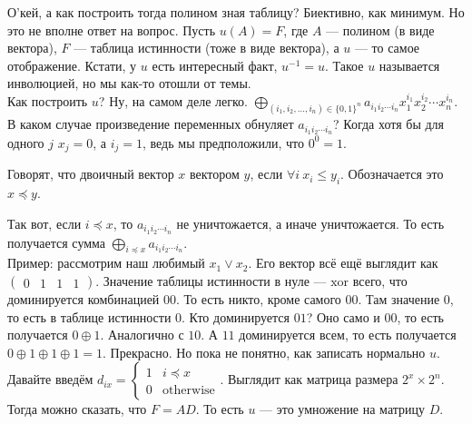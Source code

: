 \documentclass{article}
\begin{document}
\begin{itemize}
\begin{Comment}
            О'кей, а как построить тогда полином зная таблицу? Биективно, как минимум. Но это не вполне ответ на вопрос. Пусть $u(A)=F$, где $A$ --- полином (в виде вектора), $F$ --- таблица истинности (тоже в виде вектора), а $u$ --- то самое отображение. Кстати, у $u$ есть интересный факт, $u^{-1}=u$. Такое $u$ называется инволюцией, но мы как-то отошли от темы.\\
            Как построить $u$? Ну, на самом деле легко. $\bigoplus\limits_{(i_1,i_2,\ldots,i_n)\in\{0,1\}^n}a_{i_1i_2\cdots i_n}x_1^{i_1}x_2^{i_2}\cdots x_n^{i_n}$. В каком случае произведение переменных обнуляет $a_{i_1i_2\cdots i_n}$? Когда хотя бы для одного $j$ $x_j=0$, а $i_j=1$, ведь мы предположили, что $0^0=1$.
        \end{Comment}
        \dfn Говорят, что двоичный вектор $x$  вектором $y$, если $\forall i~x_i\leqslant y_i$. Обозначается это $x\preccurlyeq y$.
        \begin{Comment}
            Так вот, если $i\preccurlyeq x$, то $a_{i_1i_2\cdots i_n}$ не уничтожается, а иначе уничтожается. То есть получается сумма $\bigoplus\limits_{i\preccurlyeq x}a_{i_1i_2\cdots i_n}$.\\
            Пример: рассмотрим наш любимый $x_1\lor x_2$. Его вектор всё ещё выглядит как $\left(\begin{matrix}
                0 & 1 & 1 & 1
            \end{matrix}\right)$. Значение таблицы истинности в нуле --- $\mathrm{xor}$ всего, что доминируется комбинацией $00$. То есть никто, кроме самого $00$. Там значение 0, то есть в таблице истинности 0. Кто доминируется $01$? Оно само и $00$, то есть получается $0\oplus 1$. Аналогично с $10$. А $11$ доминируется всем, то есть получается $0\oplus 1\oplus 1\oplus 1=1$. Прекрасно. Но пока не понятно, как записать нормально $u$. Давайте введём $d_{ix}=\begin{cases}
                1 & i\preccurlyeq x\\
                0 & \mathrm{otherwise}
            \end{cases}$. Выглядит как матрица размера $2^x\times 2^n$. Тогда можно сказать, что $F=AD$. То есть $u$ --- это умножение на матрицу $D$.\\

\end{Comment}
\end{itemize}
\end{document}
